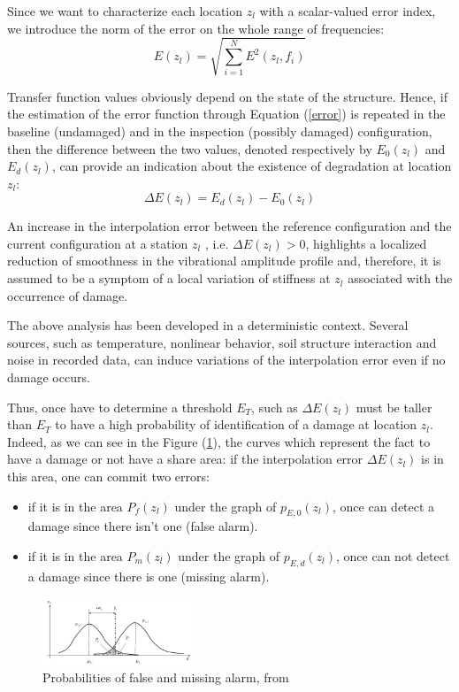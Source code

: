 \documentclass[journal]{IEEEtran}
\begin{document}
Since we want to characterize each location $z_l$ with a scalar-valued error index, we introduce the norm of the error on the whole range of
frequencies:
\begin{equation}
E(z_l) = \sqrt{  \sum\limits_{i=1}^N  E^2(z_l,f_i) }
\label{error}
\end{equation}


Transfer function values obviously depend on the state of the structure. Hence, if the estimation of the error function
through Equation (\ref{error}) is repeated in the baseline (undamaged) and in the inspection (possibly damaged) configuration, then the
difference between the two values, denoted respectively by $E_0(z_l)$ and $E_d(z_l)$, can provide an indication about the existence of
degradation at location $z_l$:
\begin{equation}
\Delta E(z_l) = E_d(z_l) - E_0(z_l)
\end{equation}

An increase in the interpolation error between the reference configuration and the current configuration at a station $z_l$ , i.e.
$ \Delta E(z_l) > 0$, highlights a localized reduction of smoothness in the vibrational amplitude profile and, therefore, it is assumed
to be a symptom of a local variation of stiffness at $z_l$ associated with the occurrence of damage.

The above analysis has been developed in a deterministic context. Several sources, such as temperature, nonlinear
behavior, soil structure interaction and noise in recorded data, can induce variations of the interpolation error even if no
damage occurs.

Thus, once have to determine a threshold $E_T$, such as $ \Delta E(z_l)$ must be taller than $E_T$ to have a high probability of identification of a damage at location $z_l$. Indeed, as we can see in the Figure (\ref{proba}), the curves which represent the fact to have a damage or not have a share area: if the interpolation error $ \Delta E(z_l)$ is in this area, one can commit two errors:
\begin{itemize}
\item if it is in the area $P_f(z_l)$ under the graph of $p_{E,0}(z_l)$, once can detect a damage since there isn't one (false alarm).
\item if it is in the area $P_m(z_l)$ under the graph of $p_{E,d}(z_l)$, once can not detect a damage since there is one (missing alarm).
\end{itemize}


\begin{figure}[h!]
  \centering
  \includegraphics[width=0.4\textwidth]{images/gaussiennes.png}
  \caption{Probabilities of false and missing alarm, from \cite{dilena2015damage}}
  \label{proba}
\end{figure}
\end{document}
